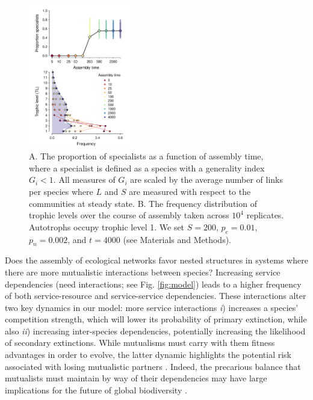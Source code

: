 \documentclass[9pt,twocolumn,twoside]{pnas-new}
\begin{document}
\begin{figure}[h!]
\centering
\includegraphics[width=0.4\textwidth]{fig_trophic.pdf}
\caption{
A. The proportion of specialists as a function of assembly time, where a specialist is defined as a species with a generality index $G_i < 1$.
All measures of $G_i$ are scaled by the average number of links per species where $L$ and $S$ are measured with respect to the communities at steady state.
B. The frequency distribution of trophic levels over the course of assembly taken across $10^4$ replicates. Autotrophs occupy trophic level 1.
We set $S=200$, $p_e=0.01$, $p_n=0.002$, and $t=4000$ (see Materials and Methods).
}
\label{fig:trophic}
\end{figure}


Does the assembly of ecological networks favor nested structures in systems where there are more mutualistic interactions between species?
Increasing service dependencies (need interactions; see Fig. \ref{fig:model}) leads to a higher frequency of both service-resource and service-service dependencies.
These interactions alter two key dynamics in our model: more service interactions \emph{i}) increases a species' competition strength, which will lower its probability of primary extinction, while also \emph{ii}) increasing inter-species dependencies, potentially increasing the likelihood of secondary extinctions.
While mutualisms must carry with them fitness advantages in order to evolve, the latter dynamic highlights the potential risk associated with losing mutualistic partners \cite{Bond1994,Colwell2012}.
Indeed, the precarious balance that mutualists must maintain by way of their dependencies may have large implications for the future of global biodiversity \cite{Dunn2009}.
\end{document}

